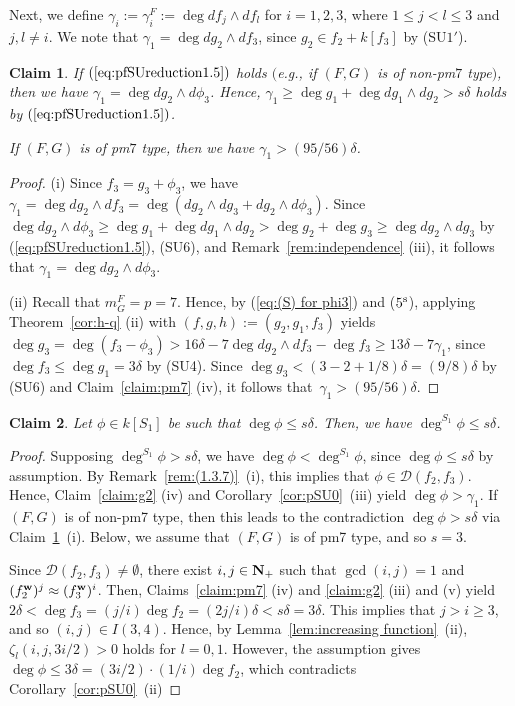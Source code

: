 \documentclass{amsart}
\theoremstyle{plain}
\newtheorem{claim}{Claim}
\theoremstyle{definition}
\newcommand{\nd}{\noindent}
\newcommand{\N}{{\bf N}}
\newcommand{\w}{{\bf w}}
\begin{document}
Next, we define $\gamma _i:=\gamma _i^F:=\deg df_j\wedge df_l$ 
for $i=1,2,3$, 
where $1\le j<l\le 3$ and $j,l\ne i$. 
We note that $\gamma _1=\deg dg_2\wedge df_3$, 
since $g_2\in f_2+k[f_3]$ by (SU$1'$). 


\begin{claim}\label{claim:D}
\nd{\rm (i)} 
If $(\ref{eq:pfSUreduction1.5})$ holds 
$($e.g., if $(F,G)$ is of non-pm$7$ type$)$, 
then we have 
$\gamma _1=\deg dg_2\wedge d\phi _3$. 
Hence, 
$\gamma _1\ge \deg g_1+\deg dg_1\wedge dg_2>s\delta $ 
holds by $(\ref{eq:pfSUreduction1.5})$. 


\nd{\rm (ii)} 
If $(F,G)$ is of pm$7$ type, 
then we have $\gamma _1>(95/56)\delta $. 
\end{claim}
\begin{proof}
(i) 
Since $f_3=g_3+\phi _3$, we have 
$\gamma _1=\deg dg_2\wedge df_3
=\deg (dg_2\wedge dg_3+dg_2\wedge d\phi _3)$. 
Since 
$\deg dg_2\wedge d\phi _3\ge \deg g_1+\deg dg_1\wedge dg_2
>\deg g_2+\deg g_3\ge \deg dg_2\wedge dg_3$ 
by (\ref{eq:pfSUreduction1.5}), 
(SU6), 
and Remark~\ref{rem:independence} (iii), 
it follows that $\gamma _1=\deg dg_2\wedge d\phi _3$. 



(ii) 
Recall that $m_G^F=p=7$. 
Hence, 
by (\ref{eq:(S) for phi3}) and ($5^{\rm s}$), 
applying Theorem~\ref{cor:h-q} (ii) with 
$(f,g,h):=(g_2,g_1,f_3)$ 
yields 
$\deg g_3=\deg (f_3-\phi _3)>
16\delta -7\deg dg_2\wedge df_3-\deg f_3\ge 
13\delta -7\gamma _1$, 
since $\deg f_3\le \deg g_1=3\delta $ by (SU4). 
Since $\deg g_3<(3-2+1/8)\delta =(9/8)\delta $ 
by (SU6) and Claim~\ref{claim:pm7} (iv), 
it follows that~$\gamma _1>(95/56)\delta $. 
\end{proof}




\begin{claim}\label{claim:S1}
Let $\phi \in k[S_1]$ be such that $\deg \phi \le s\delta $. 
Then, we have $\deg ^{S_1}\phi \le s\delta $. 
\end{claim}
\begin{proof}
Supposing $\deg ^{S_1}\phi >s\delta $, 
we have 
$\deg \phi <\deg ^{S_1}\phi $, 
since $\deg \phi \le s\delta $ by assumption. 
By Remark~\ref{rem:(1.3.7)}~(i), 
this implies that $\phi \in \mathcal{D}(f_2,f_3)$. 
Hence, 
Claim~\ref{claim:g2} (iv) and Corollary~\ref{cor:pSU0}~(iii) yield 
$\deg \phi >\gamma _1$. 
If $(F,G)$ is of non-pm7 type, 
then this leads to the contradiction $\deg \phi >s\delta $ 
via Claim~\ref{claim:D}~(i). 
Below, we assume that $(F,G)$ is of pm7 type, 
and so $s=3$. 


Since 
$\mathcal{D}(f_2,f_3)\ne \emptyset $, 
there exist $i,j\in \N _+$ 
such that $\gcd (i,j)=1$ and 
$(f_2^{\w })^j\approx (f_3^{\w })^i$. 
Then, Claims~\ref{claim:pm7} (iv) and \ref{claim:g2} (iii) and (v) 
yield 
$2\delta <\deg f_3=(j/i)\deg f_2=(2j/i)\delta <
s\delta =3\delta $. 
This implies that $j>i\ge 3$, 
and so $(i,j)\in I(3,4)$. 
Hence, 
by Lemma~\ref{lem:increasing function}~(ii), 
$\zeta _l(i,j,3i/2)>0$ holds for $l=0,1$. 
However, the assumption gives 
$\deg \phi \le 3\delta =(3i/2)\cdot (1/i)\deg f_2$, 
which contradicts Corollary~\ref{cor:pSU0}~(ii) 
\end{proof}
\end{document}
